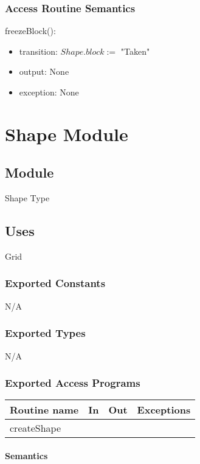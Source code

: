 \documentclass[12pt]{article}
\begin{document}
\subsubsection* {Access Routine Semantics}

\noindent freezeBlock():
\begin{itemize}
\item transition: $Shape.block := $ "Taken"
\item output: None
\item exception: None
\end{itemize}

\newpage

\section* {Shape Module}

\subsection*{Module}

Shape Type

\subsection* {Uses}

Grid


\subsubsection*{Exported Constants}
N/A
\subsubsection*{Exported Types}

N/A

\subsubsection* {Exported Access Programs}

\begin{tabular}{| l | l | l | l |}
\hline
\textbf{Routine name} & \textbf{In} & \textbf{Out} & \textbf{Exceptions}\\
\hline
createShape &  &  & \\
\hline
\end{tabular}

\paragraph* {Semantics}
\end{document}
